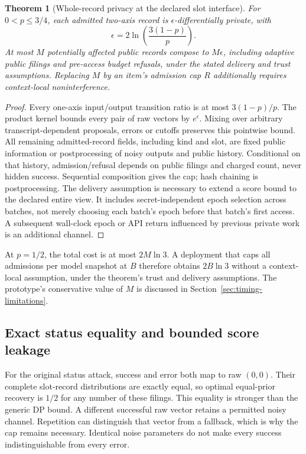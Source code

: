 \documentclass[10pt,twocolumn]{article}
\newtheorem{theorem}{Theorem}
\begin{document}
\begin{theorem}[Whole-record privacy at the declared slot interface]
For $0<p\leq3/4$, each admitted two-axis record is $\epsilon$-differentially private, with
\[
\epsilon=2\ln\!\left(\frac{3(1-p)}p\right).
\]
At most $M$ potentially affected public records compose to $M\epsilon$, including adaptive public filings and pre-access budget refusals, under the stated delivery and trust assumptions. Replacing $M$ by an item's admission cap $R$ additionally requires context-local noninterference.
\end{theorem}
\begin{proof}
Every one-axis input/output transition ratio is at most $3(1-p)/p$. The product kernel bounds every pair of raw vectors by $e^\epsilon$. Mixing over arbitrary transcript-dependent proposals, errors or cutoffs preserves this pointwise bound. All remaining admitted-record fields, including kind and slot, are fixed public information or postprocessing of noisy outputs and public history. Conditional on that history, admission/refusal depends on public filings and charged count, never hidden success. Sequential composition gives the cap; hash chaining is postprocessing. The delivery assumption is necessary to extend a score bound to the declared entire view. It includes secret-independent epoch selection across batches, not merely choosing each batch's epoch before that batch's first access. A subsequent wall-clock epoch or API return influenced by previous private work is an additional channel.
\end{proof}

At $p=1/2$, the total cost is at most $2M\ln3$. A deployment that caps all admissions per model snapshot at $B$ therefore obtains $2B\ln3$ without a context-local assumption, under the theorem's trust and delivery assumptions. The prototype's conservative value of $M$ is discussed in Section~\ref{sec:timing-limitations}.

\subsection{Exact status equality and bounded score leakage}\label{sec:status-equality}
For the original status attack, success and error both map to raw $(0,0)$. Their complete slot-record distributions are exactly equal, so optimal equal-prior recovery is $1/2$ for any number of these filings. This equality is stronger than the generic DP bound. A different successful raw vector retains a permitted noisy channel. Repetition can distinguish that vector from a fallback, which is why the cap remains necessary. Identical noise parameters do not make every success indistinguishable from every error.
\end{document}
